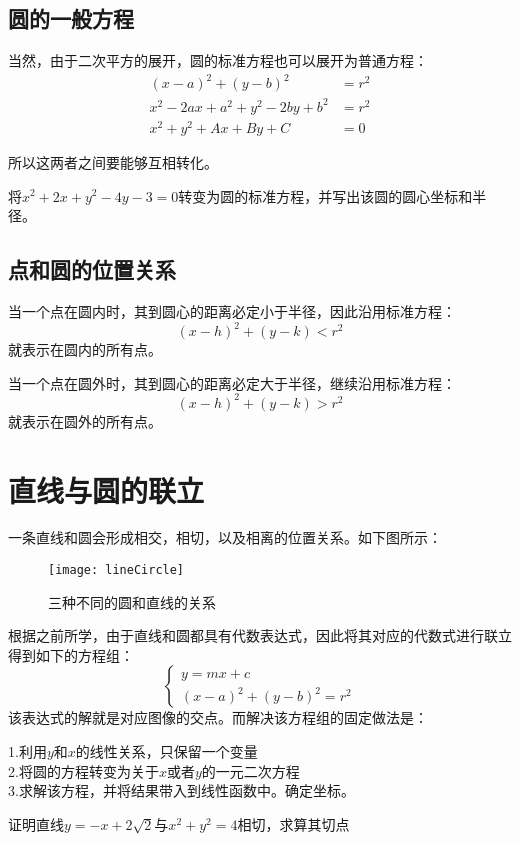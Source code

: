 \subsection*{圆的一般方程}
\label{subsec:Normal Equation of a circle}
当然，由于二次平方的展开，圆的标准方程也可以展开为普通方程：
\begin{align*}
	(x-a)^2+(y-b)^2 &=r^2\\
	x^2-2ax+a^2+y^2-2by+b^2 &=r^2\\
	x^2+y^2+Ax+By+C&=0
\end{align*}

所以这两者之间要能够互相转化。

\begin{TaskBox}
将$x^2+2x+y^2-4y-3=0$转变为圆的标准方程，并写出该圆的圆心坐标和半径。
\end{TaskBox}

\subsection*{点和圆的位置关系}
\label{subsec:Position of a Point with repsect to a Circle}
当一个点在圆内时，其到圆心的距离必定小于半径，因此沿用标准方程：
\[
	(x-h)^2+(y-k)<r^2
\]
就表示在圆内的所有点。

当一个点在圆外时，其到圆心的距离必定大于半径，继续沿用标准方程：
\[
	(x-h)^2+(y-k)>r^2
\]
就表示在圆外的所有点。
\clearpage


\section{直线与圆的联立}
\label{subsec:Line and Circle}
一条直线和圆会形成相交，相切，以及相离的位置关系。如下图所示：
\begin{figure}[H]
\centering
\texttt{[image: lineCircle]}
\caption{三种不同的圆和直线的关系}
\end{figure}

根据之前所学，由于直线和圆都具有代数表达式，因此将其对应的代数式进行联立得到如下的方程组：
\[
\left\{\begin{matrix}
y=mx+c\\
(x-a)^2+(y-b)^2=r^2
\end{matrix}\right.
\]
该表达式的解就是对应图像的交点。而解决该方程组的固定做法是：

\noindent1.利用$y$和$x$的线性关系，只保留一个变量\\
2.将圆的方程转变为关于$x$或者$y$的一元二次方程\\
3.求解该方程，并将结果带入到线性函数中。确定坐标。

\begin{TaskBox}
证明直线$y=-x+2\sqrt 2$与$x^2+y^2=4$相切，求算其切点
\end{TaskBox}
\clearpage

